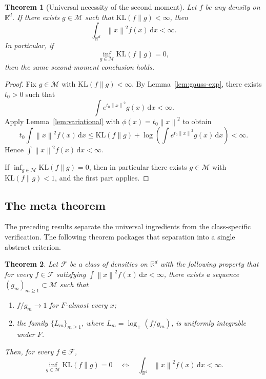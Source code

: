 \documentclass[11pt]{article}
\newtheorem{theorem}{Theorem}[section]
\theoremstyle{definition}
\begin{document}
\begin{theorem}[Universal necessity of the second moment]
\label{thm:necessity}
Let $f$ be any density on $\mathbb{R}^d$. If there exists $g\in\mathcal M$ such that $\mathrm{KL}(f\|g)<\infty$, then
\[
\int_{\mathbb{R}^d}\left\lVert x \right\rVert^2 f(x)\,\mathrm{d}x<\infty.
\]
In particular, if
\[
\inf_{g\in\mathcal M}\mathrm{KL}(f\|g)=0,
\]
then the same second-moment conclusion holds.
\end{theorem}

\begin{proof}
Fix $g\in\mathcal M$ with $\mathrm{KL}(f\|g)<\infty$. By Lemma~\ref{lem:gauss-exp}, there exists $t_0>0$ such that
\[
\int e^{t_0\left\lVert x \right\rVert^2}g(x)\,\mathrm{d}x<\infty.
\]
Apply Lemma~\ref{lem:variational} with $\phi(x)=t_0\left\lVert x \right\rVert^2$ to obtain
\[
t_0\int \left\lVert x \right\rVert^2 f(x)\,\mathrm{d}x
\le \mathrm{KL}(f\|g)+\log\!\left(\int e^{t_0\left\lVert x \right\rVert^2}g(x)\,\mathrm{d}x\right)<\infty.
\]
Hence $\int \left\lVert x \right\rVert^2 f(x)\,\mathrm{d}x<\infty$.

If $\inf_{g\in\mathcal M}\mathrm{KL}(f\|g)=0$, then in particular there exists $g\in\mathcal M$ with $\mathrm{KL}(f\|g)<1$, and the first part applies.
\end{proof}

\subsection{The meta theorem}

The preceding results separate the universal ingredients from the class-specific verification. The following theorem packages that separation into a single abstract criterion.

\begin{theorem}
\label{thm:metaiff}
Let $\mathcal F$ be a class of densities on $\mathbb{R}^d$ with the following property that for every $f\in\mathcal F$ satisfying $\int \left\lVert x \right\rVert^2 f(x)\,\mathrm{d}x<\infty$, there exists a sequence $(g_m)_{m\ge1}\subset\mathcal M$ such that
\begin{enumerate}[label=\textnormal{(\alph*)}]
    \item $f/g_m\to1$ for $F$-almost every $x$;
    \item the family $\{L_m\}_{m\ge1}$, where $L_m=\log_+(f/g_m)$, is uniformly integrable under $F$.
\end{enumerate}
Then, for every $f\in\mathcal F$,
\[
\inf_{g\in\mathcal M}\mathrm{KL}(f\|g)=0
\quad\Longleftrightarrow\quad
\int_{\mathbb{R}^d}\left\lVert x \right\rVert^2f(x)\,\mathrm{d}x<\infty.
\]
\end{theorem}
\end{document}
